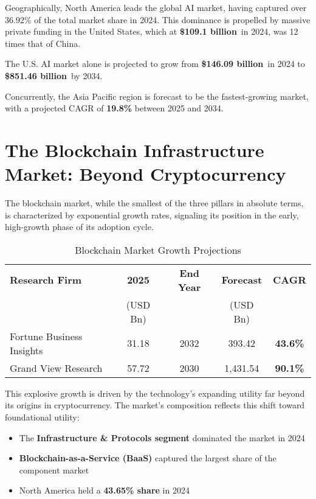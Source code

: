\documentclass[11pt,a4paper]{report}
\newcommand{\marketvalue}[2]{\textcolor{trust}{\textbf{\$#1}}\,\textcolor{darkgray}{#2}}
\newcommand{\cagr}[1]{\textcolor{sun}{\textbf{#1\%}}}
\begin{document}
Geographically, North America leads the global AI market, having captured over 36.92\% of the total market share in 2024. This dominance is propelled by massive private funding in the United States, which at \marketvalue{109.1 billion}{} in 2024, was 12 times that of China. 

The U.S. AI market alone is projected to grow from \marketvalue{146.09 billion}{} in 2024 to \marketvalue{851.46 billion}{} by 2034.

Concurrently, the Asia Pacific region is forecast to be the fastest-growing market, with a projected CAGR of \cagr{19.8} between 2025 and 2034.

\section{The Blockchain Infrastructure Market: Beyond Cryptocurrency}

The blockchain market, while the smallest of the three pillars in absolute terms, is characterized by exponential growth rates, signaling its position in the early, high-growth phase of its adoption cycle.
\begin{table}[H]
\centering
\caption{Blockchain Market Growth Projections}
\begin{tabular}{lcccc}
\toprule
\textbf{Research Firm} & \textbf{2025} & \textbf{End Year} & \textbf{Forecast} & \textbf{CAGR} \\
& (USD Bn) & & (USD Bn) & \\
\midrule
Fortune Business Insights & 31.18 & 2032 & 393.42 & \cagr{43.6} \\
Grand View Research & 57.72 & 2030 & 1,431.54 & \cagr{90.1} \\
\bottomrule
\end{tabular}
\end{table}

This explosive growth is driven by the technology's expanding utility far beyond its origins in cryptocurrency. The market's composition reflects this shift toward foundational utility:

\begin{itemize}
    \item The \textbf{Infrastructure \& Protocols segment} dominated the market in 2024
    \item \textbf{Blockchain-as-a-Service (BaaS)} captured the largest share of the component market
    \item North America held a \textbf{43.65\% share} in 2024
\end{itemize}
\end{document}
